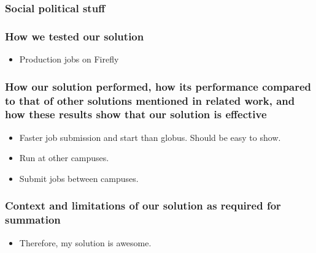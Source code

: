 \documentclass[11pt]{article}
\begin{document}
\subsubsection*{Social political stuff}

\subsubsection*{How we tested our solution}
\begin{itemize}

\item Production jobs on Firefly

\end{itemize}


\subsubsection*{How our solution performed, how its performance compared to
that of other solutions mentioned in related work, and how these results show
that our solution is effective}

\begin{itemize}

\item
Faster job submission and start than globus.  Should be easy to show.

\item
Run at other campuses.

\item
Submit jobs between campuses.

\end{itemize}


\subsubsection*{Context and limitations of our solution as required for 
summation}
\begin{itemize}
\item
Therefore, my solution is awesome.

\end{itemize}
\end{document}
